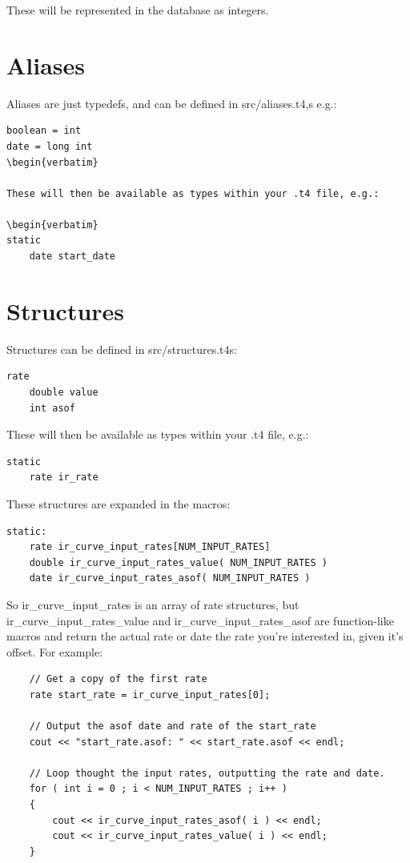 \documentclass{report}
\begin{document}
These will be represented in the database as integers.

\section{Aliases}

Aliases are just typedefs, and can be defined in src/aliases.t4,s e.g.:

\begin{verbatim}
boolean = int
date = long int
\begin{verbatim}

These will then be available as types within your .t4 file, e.g.:

\begin{verbatim}
static
    date start_date
\end{verbatim}




\section{Structures}

Structures can be defined in src/structures.t4s:

\begin{verbatim}
rate
    double value
    int asof
\end{verbatim}

These will then be available as types within your .t4 file, e.g.:

\begin{verbatim}
static
    rate ir_rate
\end{verbatim}

These structures are expanded in the macros:

\begin{verbatim}
static:
    rate ir_curve_input_rates[NUM_INPUT_RATES]
    double ir_curve_input_rates_value( NUM_INPUT_RATES )
    date ir_curve_input_rates_asof( NUM_INPUT_RATES )
\end{verbatim}

So ir_curve_input_rates is an array of rate structures, but ir_curve_input_rates_value and ir_curve_input_rates_asof are function-like macros and return the actual rate or date the rate you're interested in, given it's offset. For example:

\begin{verbatim}
    // Get a copy of the first rate
    rate start_rate = ir_curve_input_rates[0];

    // Output the asof date and rate of the start_rate
    cout << "start_rate.asof: " << start_rate.asof << endl;

    // Loop thought the input rates, outputting the rate and date.
    for ( int i = 0 ; i < NUM_INPUT_RATES ; i++ )
    {
        cout << ir_curve_input_rates_asof( i ) << endl;
        cout << ir_curve_input_rates_value( i ) << endl;
    }
\end{verbatim}
\end{document}
